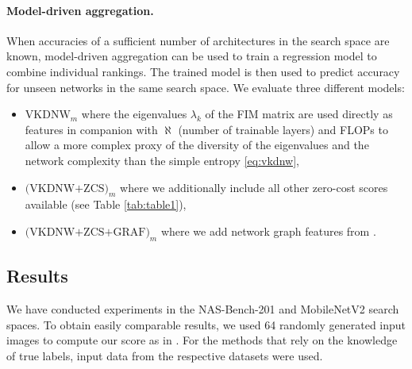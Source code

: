 \paragraph{Model-driven aggregation.}
When accuracies of a sufficient number of architectures in the search space are known, 
model-driven aggregation can be used to train a regression model to combine individual rankings. The trained model is then used to predict accuracy for unseen networks in the same search space. We evaluate three different models:
\begin{itemize}
    \item $\text{VKDNW}_{m}$ where the eigenvalues $\lambda_k$ of the FIM matrix are used directly as features in companion with $\aleph$ (number of trainable layers) and FLOPs to allow a more complex proxy of the diversity of the eigenvalues and the network complexity than the simple entropy \cref{eq:vkdnw},
    \item $\text{(VKDNW+ZCS)}_{m}$ where we additionally include all other zero-cost scores available (see Table \ref{tab:table1}),
    \item $\text{(VKDNW+ZCS+GRAF)}_{m}$ where we add network graph features from \cite{kadlecova2024surprisingly}. 
\end{itemize}


\subsection{Results}
\label{subsec:results}

We have conducted experiments in the NAS-Bench-201 \cite{dong2020bench} and MobileNetV2 \cite{lin2021zen, sandler2018mobilenetv2} search spaces. To obtain easily comparable results, we used 64 randomly generated input images to compute our score as in \cite{lee2024az}. For the methods that rely on the knowledge of true labels, input data from the respective datasets were used.



